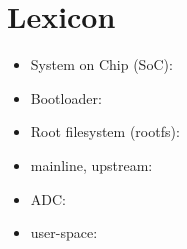 \chapter*{Lexicon}

\begin{itemize}
\item System on Chip (SoC):
\item Bootloader:
\item Root filesystem (rootfs):
\item mainline, upstream:
\item ADC:
\item user-space:
\end{itemize}
